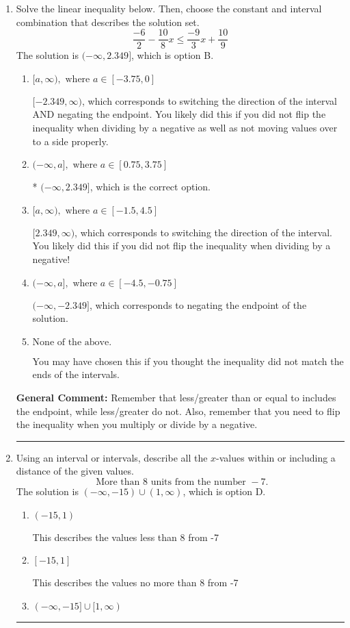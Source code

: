 \documentclass{extbook}[14pt]
\newcommand{\litem}[1]{\item #1

\rule{\textwidth}{0.4pt}}
\begin{document}
\begin{enumerate}\litem{
Solve the linear inequality below. Then, choose the constant and interval combination that describes the solution set.
\[ \frac{-6}{2} - \frac{10}{8} x \leq \frac{-9}{3} x + \frac{10}{9} \]The solution is \( (-\infty, 2.349] \), which is option B.\begin{enumerate}[label=\Alph*.]
\item \( [a, \infty), \text{ where } a \in [-3.75, 0] \)

 $[-2.349, \infty)$, which corresponds to switching the direction of the interval AND negating the endpoint. You likely did this if you did not flip the inequality when dividing by a negative as well as not moving values over to a side properly.
\item \( (-\infty, a], \text{ where } a \in [0.75, 3.75] \)

* $(-\infty, 2.349]$, which is the correct option.
\item \( [a, \infty), \text{ where } a \in [-1.5, 4.5] \)

 $[2.349, \infty)$, which corresponds to switching the direction of the interval. You likely did this if you did not flip the inequality when dividing by a negative!
\item \( (-\infty, a], \text{ where } a \in [-4.5, -0.75] \)

 $(-\infty, -2.349]$, which corresponds to negating the endpoint of the solution.
\item \( \text{None of the above}. \)

You may have chosen this if you thought the inequality did not match the ends of the intervals.
\end{enumerate}

\textbf{General Comment:} Remember that less/greater than or equal to includes the endpoint, while less/greater do not. Also, remember that you need to flip the inequality when you multiply or divide by a negative.
}
\litem{
Using an interval or intervals, describe all the $x$-values within or including a distance of the given values.
\[ \text{ More than } 8 \text{ units from the number } -7. \]The solution is \( (-\infty, -15) \cup (1, \infty) \), which is option D.\begin{enumerate}[label=\Alph*.]
\item \( (-15, 1) \)

This describes the values less than 8 from -7
\item \( [-15, 1] \)

This describes the values no more than 8 from -7
\item \( (-\infty, -15] \cup [1, \infty) \)


\end{enumerate}}
\end{enumerate}
\end{document}
